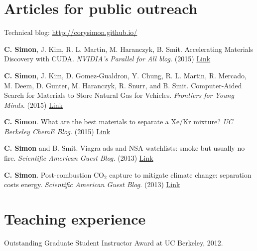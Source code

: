 \documentclass[10pt,a4paper,sans]{moderncv}        %
\begin{document}
\section{Articles for public outreach}
Technical blog: \href{http://corysimon.github.io/}{http://corysimon.github.io/}

\begin{etaremune}[itemsep=0pt]
\item \textbf{C. Simon}, J. Kim, R. L. Martin, M. Haranczyk, B. Smit. Accelerating Materials Discovery with CUDA. \emph{NVIDIA's Parallel for All blog.} (2015) \href{http://devblogs.nvidia.com/parallelforall/accelerating-materials-discovery-cuda/}{Link}

\item \textbf{C. Simon}, J. Kim, D. Gomez-Gualdron, Y. Chung, R. L. Martin, R. Mercado, M. Deem, D. Gunter, M. Haranczyk, R. Snurr, and B. Smit. Computer-Aided Search for Materials to Store Natural Gas for Vehicles. \emph{Frontiers for Young Minds.} (2015) \href{http://dx.doi.org/10.3389/frym.2015.00011}{Link}

\item \textbf{C. Simon}. What are the best materials to separate a Xe/Kr mixture? \emph{UC Berkeley ChemE Blog.} (2015) \href{http://berkeleycheme.github.io//articles/xekr/}{Link}

\item \textbf{C. Simon} and B. Smit. Viagra ads and NSA watchlists: smoke but usually no fire. \emph{Scientific American Guest Blog.} (2013) \href{http://blogs.scientificamerican.com/guest-blog/2013/09/22/viagra-ads-and-nsa-watch-lists-smoke-but-usually-no-fire/}{Link}

\item \textbf{C. Simon}. Post-combustion CO$_2$ capture to mitigate climate change: separation costs energy. \emph{Scientific American Guest Blog.} (2013) \href{http://blogs.scientificamerican.com/guest-blog/2013/03/07/post-combustion-co2-capture-to-mitigate-climate-change-separation-costs-energy/}{Link}
\end{etaremune}



\section{Teaching experience}

Outstanding Graduate Student Instructor Award at UC Berkeley, 2012.
\end{document}
